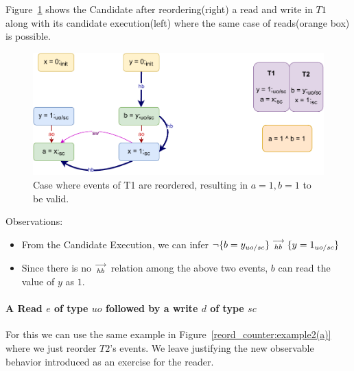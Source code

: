         Figure~\ref{reord_counter:example2(b)} shows the Candidate after reordering(right) a read and write in $T1$ along with its candidate execution(left) where the same case of reads(orange box) is possible. 
        \begin{figure}[H]
            \centering
            \includegraphics[scale=0.7]{4.InstructionReordering/4.ValidReorderingCandidate/Example3R(Rsc-Wuo,sc).pdf}
            \caption{Case where events of T1 are reordered, resulting in $a = 1, b = 1$ to be valid.}
            \label{reord_counter:example2(b)}
        \end{figure}
        
        Observations:
        \begin{itemize}
            \item From the Candidate Execution, we can infer $\neg\{b=y_{uo/sc}\}\stackrel{\longrightarrow}{_{hb}}\{y=1_{uo/sc}\}$
            \item Since there is no $\stackrel{\longrightarrow}{_{hb}}$ relation among the above two events, $b$ can read the value of $y$ as $1$.
        \end{itemize}

    \paragraph{A Read $e$ of type $uo$ followed by a write $d$ of type $sc$}

        For this we can use the same example in Figure~\ref{reord_counter:example2(a)} where we just reorder $T2$'s events.
        We leave justifying the new observable behavior introduced as an exercise for the reader.
    
        
